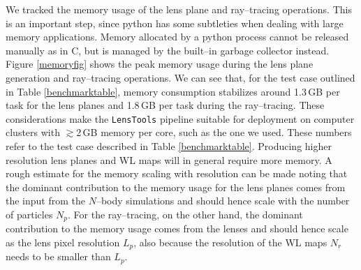 \documentclass[5p]{elsarticle}
\newcommand{\LT}{\texttt{LensTools} }
\begin{document}
We tracked the memory usage of the lens plane and ray--tracing operations. This is an important step, since {\sc python} has some subtleties when dealing with large memory applications. Memory allocated by a {\sc python} process cannot be released manually as in {\sc C}, but is managed by the built--in garbage collector instead. Figure \ref{memoryfig} shows the peak memory usage during the lens plane generation and ray--tracing operations. We can see that, for the test case outlined in Table \ref{benchmarktable}, memory consumption stabilizes around 1.3\,GB per task for the lens planes and 1.8\,GB per task during the ray--tracing. These considerations make the \LT pipeline suitable for deployment on computer clusters with $\gtrsim$2\,GB memory per core, such as the one we used. These numbers refer to the test case described in Table \ref{benchmarktable}. Producing higher resolution lens planes and WL maps will in general require more memory. A rough estimate for the memory scaling with resolution can be made noting that the dominant contribution to the memory usage for the lens planes comes from the input from the $N$--body simulations and should hence scale with the number of particles $N_p$. For the ray--tracing, on the other hand, the dominant contribution to the memory usage comes from the lenses and should hence scale as the lens pixel resolution $L_p$, also because the resolution of the WL maps $N_r$ needs to be smaller than $L_p$.     
\end{document}
